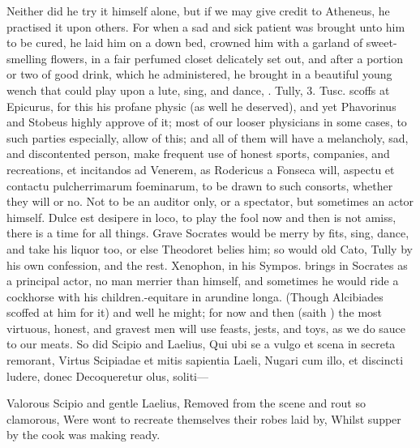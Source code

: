 {Neither did he try it himself alone, but if we may give credit to
Atheneus, he practised it upon others. For when a sad and sick
patient was brought unto him to be cured, he laid him on a down bed,
crowned him with a garland of sweet-smelling flowers, in a fair
perfumed closet delicately set out, and after a portion or two of good
drink, which he administered, he brought in a beautiful young
wench that could play upon a lute, sing, and dance, \etc{}. Tully, 3.
Tusc. scoffs at Epicurus, for this his profane physic (as well he
deserved), and yet Phavorinus and Stobeus highly approve of it; most of
our looser physicians in some cases, to such parties especially, allow
of this; and all of them will have a melancholy, sad, and discontented
person, make frequent use of honest sports, companies, and recreations,
et incitandos ad Venerem, as Rodericus a Fonseca will, aspectu et
contactu pulcherrimarum foeminarum, to be drawn to such consorts,
whether they will or no. Not to be an auditor only, or a spectator, but
sometimes an actor himself. Dulce est desipere in loco, to play the
fool now and then is not amiss, there is a time for all things. Grave
Socrates would be merry by fits, sing, dance, and take his liquor too,
or else Theodoret belies him; so would old Cato, Tully by his own
confession, and the rest. Xenophon, in his Sympos. brings in Socrates
as a principal actor, no man merrier than himself, and sometimes he
would ride a cockhorse with his children.-equitare in arundine
longa. (Though Alcibiades scoffed at him for it) and well he might; for
now and then (saith \Plutarch) the most virtuous, honest, and gravest
men will use feasts, jests, and toys, as we do sauce to our meats. So
did Scipio and Laelius,
Qui ubi se a vulgo et scena in secreta remorant,
Virtus Scipiadae et mitis sapientia Laeli,
Nugari cum illo, et discincti ludere, donec
Decoqueretur olus, soliti---

Valorous Scipio and gentle Laelius,
Removed from the scene and rout so clamorous,
Were wont to recreate themselves their robes laid by,
Whilst supper by the cook was making ready.

}
